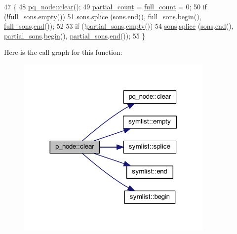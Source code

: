 \begin{DoxyCode}
47 \{
48     \mbox{\hyperlink{classpq__node_a13100e0b030cc047f382d9ddf6a44f4a}{pq\_node::clear}}(); 
49     \mbox{\hyperlink{classp__node_a9ac93f9a0f474dcc74312e820fde73b6}{partial\_count}} = \mbox{\hyperlink{classp__node_a67a7570ace6b26d3bcbff7cf71c85cb0}{full\_count}} = 0;
50     \textcolor{keywordflow}{if} (!\mbox{\hyperlink{classp__node_a09658fb7a7212e51b877444e4cee4378}{full\_sons}}.\mbox{\hyperlink{classsymlist_aca11cd6c621376bc52a18828ef92e753}{empty}}())
51     \mbox{\hyperlink{classpq__node_a2cc030cfa4560872acea8b50ebd0542b}{sons}}.\mbox{\hyperlink{classsymlist_ac2bd4d9db62ea6a3282662c62a97c3b2}{splice}} (\mbox{\hyperlink{classpq__node_a2cc030cfa4560872acea8b50ebd0542b}{sons}}.\mbox{\hyperlink{classsymlist_a7283589fa01f79d722f8256d7a6a7883}{end}}(), \mbox{\hyperlink{classp__node_a09658fb7a7212e51b877444e4cee4378}{full\_sons}}.\mbox{\hyperlink{classsymlist_a525b8d44af5d771fe15916372515cce0}{begin}}(), 
      \mbox{\hyperlink{classp__node_a09658fb7a7212e51b877444e4cee4378}{full\_sons}}.\mbox{\hyperlink{classsymlist_a7283589fa01f79d722f8256d7a6a7883}{end}}());
52 
53     \textcolor{keywordflow}{if} (!\mbox{\hyperlink{classp__node_a8acc45be68133af1b6a2823875729798}{partial\_sons}}.\mbox{\hyperlink{classsymlist_aca11cd6c621376bc52a18828ef92e753}{empty}}())
54     \mbox{\hyperlink{classpq__node_a2cc030cfa4560872acea8b50ebd0542b}{sons}}.\mbox{\hyperlink{classsymlist_ac2bd4d9db62ea6a3282662c62a97c3b2}{splice}} (\mbox{\hyperlink{classpq__node_a2cc030cfa4560872acea8b50ebd0542b}{sons}}.\mbox{\hyperlink{classsymlist_a7283589fa01f79d722f8256d7a6a7883}{end}}(), \mbox{\hyperlink{classp__node_a8acc45be68133af1b6a2823875729798}{partial\_sons}}.\mbox{\hyperlink{classsymlist_a525b8d44af5d771fe15916372515cce0}{begin}}(), 
      \mbox{\hyperlink{classp__node_a8acc45be68133af1b6a2823875729798}{partial\_sons}}.\mbox{\hyperlink{classsymlist_a7283589fa01f79d722f8256d7a6a7883}{end}}());
55 \}
\end{DoxyCode}
Here is the call graph for this function\+:\nopagebreak
\begin{figure}[H]
\begin{center}
\leavevmode
\includegraphics[width=272pt]{classp__node_af24fe11743b0836b03c108a1bf8a0995_cgraph}
\end{center}
\end{figure}
